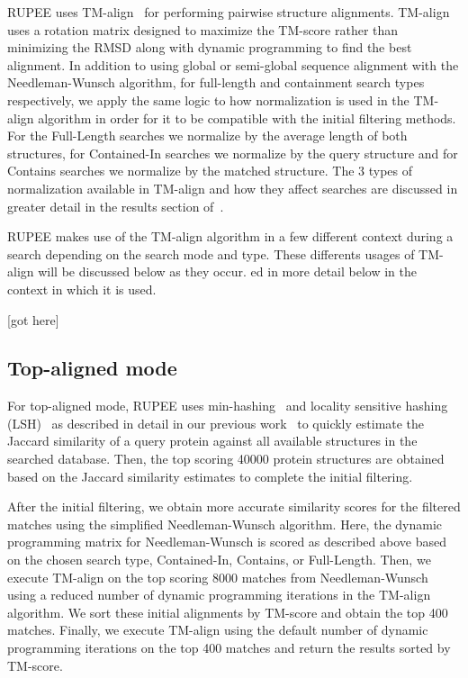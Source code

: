 \documentclass[10pt,letterpaper]{article}
\begin{document}
RUPEE uses TM-align~\cite{Zhang2005} for performing pairwise structure alignments.
TM-align uses a rotation matrix designed to maximize the TM-score rather than minimizing the RMSD along with dynamic programming to find the best alignment. 
In addition to using global or semi-global sequence alignment with the Needleman-Wunsch algorithm, for full-length and containment search types respectively, we apply the same logic to how normalization is used in the TM-align algorithm in order for it to be compatible with the initial filtering methods.
For the Full-Length searches we normalize by the average length of both structures, for Contained-In searches we normalize by the query structure and for Contains searches we normalize by the matched structure.
The 3 types of normalization available in TM-align and how they affect searches are discussed in greater detail in the results section of~\cite{Ayoub2019}.

RUPEE makes use of the TM-align algorithm in a few different context during a search depending on the search mode and type. 
These differents usages of TM-align will be discussed below as they occur. 
ed in more detail below in the context in which it is used. 

[got here]

\subsection*{Top-aligned mode}

For top-aligned mode, RUPEE uses min-hashing~\cite{Broder1998} and locality sensitive hashing (LSH)~\cite{Indyk1998} as described in detail in our previous work~\cite{Ayoub2019} to quickly estimate the Jaccard similarity of a query protein against all available structures in the searched database.  
Then, the top scoring 40000 protein structures are obtained based on the Jaccard similarity estimates to complete the initial filtering. 

After the initial filtering, we obtain more accurate similarity scores for the filtered matches using the simplified Needleman-Wunsch algorithm. 
Here, the dynamic programming matrix for Needleman-Wunsch is scored as described above based on the chosen search type, Contained-In, Contains, or Full-Length. 
Then, we execute TM-align on the top scoring 8000 matches from Needleman-Wunsch using a reduced number of dynamic programming iterations in the TM-align algorithm. 
We sort these initial alignments by TM-score and obtain the top 400 matches.
Finally, we execute TM-align using the default number of dynamic programming iterations on the top 400 matches and return the results sorted by TM-score. 
\end{document}
